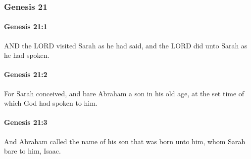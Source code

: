 	\subsubsection{Genesis 21} %
		\label{GENESIS-21}
		
		\paragraph{Genesis 21:1} %
			\label{GENESIS-21-1}

			AND the LORD visited Sarah as he had said, and the LORD did unto Sarah as he had spoken.


		\paragraph{Genesis 21:2} %
			\label{GENESIS-21-2}

			For Sarah conceived, and bare Abraham a son in his old age, at the set time of which God had spoken to him.


		\paragraph{Genesis 21:3} %
			\label{GENESIS-21-3}

			And Abraham called the name of his son that was born unto him, whom Sarah bare to him, Isaac.


